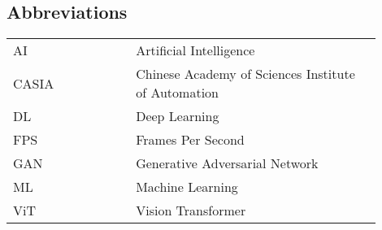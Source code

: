 \begin{center}
    \section*{Abbreviations}
    \begin{table}[h]
        \centering
        \renewcommand{\arraystretch}{1.5}
        \begin{tabular}{@{}p{0.3\linewidth}p{0.6\linewidth}@{}}
            AI    & Artificial Intelligence                             \\
            CASIA & Chinese Academy of Sciences Institute of Automation \\
            DL    & Deep Learning                                       \\
            FPS   & Frames Per Second                                   \\
            GAN   & Generative Adversarial Network                      \\
            ML    & Machine Learning                                    \\
            ViT   & Vision Transformer                                  \\
        \end{tabular}
    \end{table}
\end{center}

